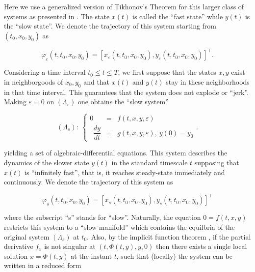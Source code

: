 	 Here we use a generalized version of Tikhonov's Theorem for this larger class of systems as presented in \cite{Marva2012}. The state $x(t)$ is called the ``fast state'' while $y(t)$ is the ``slow state''. We denote the trajectory of this system starting from $\left(t_0,x_0,y_0\right)$ as

\begin{equation} \varphi_\varepsilon\left(t,t_0,x_0,y_0\right) = \left[x_\varepsilon\left(t,t_0,x_0,y_0\right),y_\varepsilon\left(t,t_0,x_0,y_0\right)\right]^\intercal . \end{equation}

	Considering a time interval $t_0 \leq t \leq T$, we first suppose that the states $x,y$ exist in neighborgoods of $x_0,y_0$ and that $x(t)$ and $y(t)$ stay in these neighborhoods in that time interval. This guarantees that the system does not explode or ``jerk''. Making $\varepsilon = 0$ on $\left(\Lambda_\varepsilon\right)$ one obtains the ``slow system''

\begin{equation}\left(\Lambda_s\right):\ \left\{\begin{array}{rcl} 0 &=& f\left(t,x,y,\varepsilon\right) \\[3mm]\phantom{\varepsilon} \dfrac{dy}{dt} &=& g\left(t,x,y,\varepsilon\right),\ y(0) = y_0 \end{array}\right. .\end{equation}

	\noindent yielding a set of algebraic-differential equations. This system describes the dynamics of the slower state $y(t)$ in the standard timescale $t$ supposing that $x(t)$ is ``infinitely fast'', that is, it reaches steady-state immediately and continuously. We denote the trajectory of this system as

\begin{equation} \varphi_s\left(t,t_0,x_0,y_0\right) = \left[x_s\left(t,t_0,x_0,y_0\right),y_s\left(t,t_0,x_0,y_0\right)\right]^\intercal \end{equation}

	\noindent where the subscript ``s'' stands for ``slow''. Naturally, the equation $0 = f\left(t,x,y\right)$ restricts this system to a ``slow manifold'' which contains the equilbria of the original system $\left(\Lambda_\varepsilon\right)$ at $t_0$. Also, by the implicit function theorem , if the partial derivative $f_x$ is not singular at $\left(t,\Phi\left(t,y\right),y,0\right)$ then there exists a single local solution $ x = \Phi\left(t,y\right)$ at the instant $t$, such that (locally) the system can be written in a reduced form

